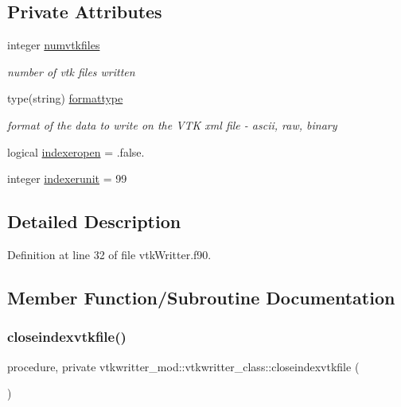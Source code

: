 \subsection*{Private Attributes}
\begin{DoxyCompactItemize}
\item 
integer \mbox{\hyperlink{structvtkwritter__mod_1_1vtkwritter__class_a31a432e4d44ff478500f0f95bb8582d2}{numvtkfiles}}
\begin{DoxyCompactList}\small\item\em number of vtk files written \end{DoxyCompactList}\item 
type(string) \mbox{\hyperlink{structvtkwritter__mod_1_1vtkwritter__class_a1488d11c6ab4adaf97a2eac301bab694}{formattype}}
\begin{DoxyCompactList}\small\item\em format of the data to write on the V\+TK xml file -\/ ascii, raw, binary \end{DoxyCompactList}\item 
logical \mbox{\hyperlink{structvtkwritter__mod_1_1vtkwritter__class_a008c58d836b282731d2ad9caabb7629c}{indexeropen}} = .false.
\item 
integer \mbox{\hyperlink{structvtkwritter__mod_1_1vtkwritter__class_a75ca6f11bb375eac69b0bd5eb8dbdbf4}{indexerunit}} = 99
\end{DoxyCompactItemize}


\subsection{Detailed Description}


Definition at line 32 of file vtk\+Writter.\+f90.



\subsection{Member Function/\+Subroutine Documentation}
\mbox{\label{structvtkwritter__mod_1_1vtkwritter__class_af87d85e730f5865b23012cea94d5274e}} 
\subsubsection{\texorpdfstring{closeindexvtkfile()}{closeindexvtkfile()}}
{\footnotesize\ttfamily procedure, private vtkwritter\+\_\+mod\+::vtkwritter\+\_\+class\+::closeindexvtkfile (\begin{DoxyParamCaption}{ }\end{DoxyParamCaption})\hspace{0.3cm}{\ttfamily [private]}}



